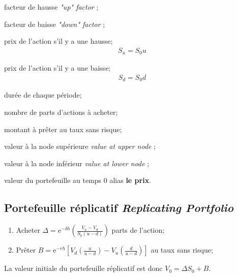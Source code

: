 \documentclass[10pt, french]{article}
\begin{document}
\begin{multicols*}{2}
\begin{distributions}
\begin{description}[leftmargin = *]
	\item[$u$]	facteur de hausse \og \textit{"up" factor} \fg{};
	\item[$d$]	facteur de baisse \og \textit{"down" factor} \fg{};	
	\item[$S_{u}$]	prix de l'action s'il y a une hausse;
		\begin{align*}
		S_{u} = S_{0} u
		\end{align*}
	\item[$S_{d}$]	prix de l'action s'il y a une baisse;
		\begin{align*}
		S_{d} = S_{0} d
		\end{align*}
	\item[$h$]	durée de chaque période;
	\item[$\Delta$]	nombre de parts d'actions à acheter;
	\item[$B$]	montant à prêter au taux sans risque;
	\item[$V_{u}$]	valeur à la node supérieure \og \textit{value at upper node} \fg{};
	\item[$V_{d}$]	valeur à la node inférieur \og \textit{value at lower node} \fg{};
	\item[$V_{0}$]	valeur du portefeuille au temps $0$ alias \textbf{le prix}.
\end{description}
\end{distributions}

\subsection*{Portefeuille réplicatif \og \textit{Replicating Portfolio} \fg{}}

\begin{algo2}
\begin{enumerate}
	\item	Acheter $\Delta	=	\textrm{e}^{-\delta h} \left(\frac{V_{u} - V_{d}}{S_{0}(u - d)}\right)$ parts de l'action;
	\item	Prêter $B	=	\textrm{e}^{-r h} \left[ V_{d}\left(	\frac{u}{u - d}\right) - V_{u} \left(\frac{d}{u - d}\right) \right]$ au taux sans risque;
\end{enumerate}

La valeur initiale du portefeuille réplicatif est donc $V_{0}	=	\Delta S_{0} + B$.
\end{algo2}


\end{multicols*}
\end{document}
